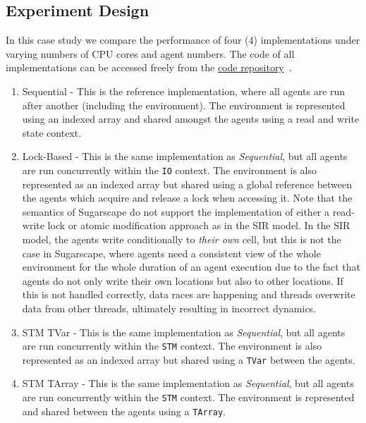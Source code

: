 \subsection{Experiment Design}
In this case study we compare the performance of four (4) implementations under varying numbers of CPU cores and agent numbers. The code of all implementations can be accessed freely from the \href{https://github.com/thalerjonathan/haskell-stm-sugarscape}{code repository}~\cite{thaler_stm_sugarscape_repository}.

\begin{enumerate}
	\item Sequential - This is the reference implementation, where all agents are run after another (including the environment). The environment is represented using an indexed array \cite{array_hackage} and shared amongst the agents using a read and write state context. 
	
	\item Lock-Based - This is the same implementation as \textit{Sequential}, but all agents are run concurrently within the \texttt{IO} context. The environment is also represented as an indexed array but shared using a global reference between the agents which acquire and release a lock when accessing it. Note that the semantics of Sugarscape do not support the implementation of either a read-write lock or atomic modification approach as in the SIR model. In the SIR model, the agents write conditionally to \textit{their own} cell, but this is not the case in Sugarscape, where agents need a consistent view of the whole environment for the whole duration of an agent execution due to the fact that agents do not only write their own locations but also to other locations. If this is not handled correctly, data races are happening and threads overwrite data from other threads, ultimately resulting in incorrect dynamics.
	
	\item STM TVar - This is the same implementation as \textit{Sequential}, but all agents are run concurrently within the \texttt{STM} context. The environment is also represented as an indexed array but shared using a \texttt{TVar} between the agents.
	
	\item STM TArray - This is the same implementation as \textit{Sequential}, but all agents are run concurrently within the \texttt{STM} context. The environment is represented and shared between the agents using a \texttt{TArray}. 
\end{enumerate}

